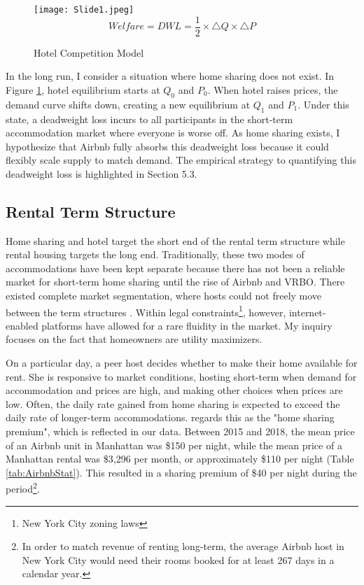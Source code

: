 \documentclass[12pt]{article}
\begin{document}
		\begin{figure}[!htbp] %
			\vspace{.2in}
			\begin{center}
				\caption{Hotel Competition Model} %
				\label{fig:HotelCompetition}
				\texttt{[image: Slide1.jpeg]}
				\begin{equation}
					Welfare = DWL = \frac{1}{2} \times  \bigtriangleup Q \times \bigtriangleup P
				\end{equation}
			\end{center}
		\end{figure}
		
			\par
			In the long run, I consider a situation where home sharing does not exist. In Figure \ref{fig:HotelCompetition}, hotel equilibrium starts at $Q_0$ and $P_0$.  When hotel raises prices, the demand curve shifts down, creating a new equilibrium at $Q_1$ and $P_1$. Under this state, a deadweight loss incurs to all participants in the short-term accommodation market where everyone is worse off. As home sharing exists, I hypothesize that Airbnb fully absorbs this deadweight loss because it could flexibly scale supply to match demand. The empirical strategy to quantifying this deadweight loss is highlighted in Section 5.3.
						
		
		\subsection{Rental Term Structure}
		Home sharing and hotel target the short end of the rental term structure while rental housing targets the long end. Traditionally, these two modes of accommodations have been kept separate because there has not been a reliable market for short-term home sharing until the rise of Airbnb and VRBO. There existed complete market segmentation, where hosts could not freely move between the term structures \citep{horn2017home}. Within legal constraints\footnote{New York City zoning laws}, however, internet-enabled platforms have allowed for a rare fluidity in the market. My inquiry focuses on the fact that homeowners are utility maximizers.
		
		\par
		On a particular day, a peer host decides whether to make their home available for rent. She is responsive to market conditions, hosting short-term when demand for accommodation and prices are high, and making other choices when prices are low. Often, the daily rate gained from home sharing is expected to exceed the daily rate of longer-term accommodations. \citet{horn2017home} regards this as the "home sharing premium", which is reflected in our data. Between 2015 and 2018, the mean price of an Airbnb unit in Manhattan was \$150 per night, while the mean price of a Manhattan rental was \$3,296 per month, or approximately \$110 per night (Table \ref{tab:AirbnbStat}). This resulted in a sharing premium of \$40 per night during the period\footnote{In order to match revenue of renting long-term, the average Airbnb host in New York City would need their rooms booked for at least 267 days in a calendar year.}.
		
\end{document}
